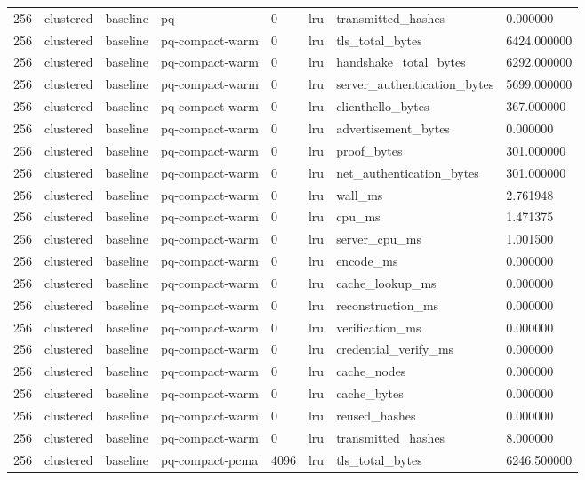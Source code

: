 \begin{tabular}{llllllll}
256 & clustered & baseline & pq & 0 & lru & transmitted\_hashes & 0.000000 \\
256 & clustered & baseline & pq-compact-warm & 0 & lru & tls\_total\_bytes & 6424.000000 \\
256 & clustered & baseline & pq-compact-warm & 0 & lru & handshake\_total\_bytes & 6292.000000 \\
256 & clustered & baseline & pq-compact-warm & 0 & lru & server\_authentication\_bytes & 5699.000000 \\
256 & clustered & baseline & pq-compact-warm & 0 & lru & clienthello\_bytes & 367.000000 \\
256 & clustered & baseline & pq-compact-warm & 0 & lru & advertisement\_bytes & 0.000000 \\
256 & clustered & baseline & pq-compact-warm & 0 & lru & proof\_bytes & 301.000000 \\
256 & clustered & baseline & pq-compact-warm & 0 & lru & net\_authentication\_bytes & 301.000000 \\
256 & clustered & baseline & pq-compact-warm & 0 & lru & wall\_ms & 2.761948 \\
256 & clustered & baseline & pq-compact-warm & 0 & lru & cpu\_ms & 1.471375 \\
256 & clustered & baseline & pq-compact-warm & 0 & lru & server\_cpu\_ms & 1.001500 \\
256 & clustered & baseline & pq-compact-warm & 0 & lru & encode\_ms & 0.000000 \\
256 & clustered & baseline & pq-compact-warm & 0 & lru & cache\_lookup\_ms & 0.000000 \\
256 & clustered & baseline & pq-compact-warm & 0 & lru & reconstruction\_ms & 0.000000 \\
256 & clustered & baseline & pq-compact-warm & 0 & lru & verification\_ms & 0.000000 \\
256 & clustered & baseline & pq-compact-warm & 0 & lru & credential\_verify\_ms & 0.000000 \\
256 & clustered & baseline & pq-compact-warm & 0 & lru & cache\_nodes & 0.000000 \\
256 & clustered & baseline & pq-compact-warm & 0 & lru & cache\_bytes & 0.000000 \\
256 & clustered & baseline & pq-compact-warm & 0 & lru & reused\_hashes & 0.000000 \\
256 & clustered & baseline & pq-compact-warm & 0 & lru & transmitted\_hashes & 8.000000 \\
256 & clustered & baseline & pq-compact-pcma & 4096 & lru & tls\_total\_bytes & 6246.500000 \\

\end{tabular}
